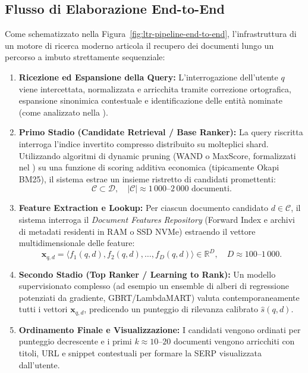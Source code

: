 \subsection{Flusso di Elaborazione End-to-End}
\label{subsec:flusso-elaborazione-end-to-end}
Come schematizzato nella Figura~\ref{fig:ltr-pipeline-end-to-end}, l'infrastruttura di un motore di ricerca moderno articola il recupero dei documenti lungo un percorso a imbuto strettamente sequenziale:
\begin{enumerate}
    \item \textbf{Ricezione ed Espansione della Query:} L'interrogazione dell'utente $q$ viene intercettata, normalizzata e arricchita tramite correzione ortografica, espansione sinonimica contestuale e identificazione delle entit\`a nominate (come analizzato nella ).
    \item \textbf{Primo Stadio (Candidate Retrieval / Base Ranker):} La query riscritta interroga l'indice invertito compresso distribuito su molteplici shard. Utilizzando algoritmi di dynamic pruning (WAND o MaxScore, formalizzati nel ) su una funzione di scoring additiva economica (tipicamente Okapi BM25), il sistema estrae un insieme ristretto di candidati promettenti:
    \begin{equation}
    \mathcal{C} \subset \mathcal{D}, \quad |\mathcal{C}| \approx 1\,000 \text{--} 2\,000 \text{ documenti}.
    \end{equation}
    \item \textbf{Feature Extraction e Lookup:} Per ciascun documento candidato $d \in \mathcal{C}$, il sistema interroga il \textit{Document Features Repository} (Forward Index e archivi di metadati residenti in RAM o SSD NVMe) estraendo il vettore multidimensionale delle feature:
    \begin{equation}
    \mathbf{x}_{q,d} = \langle f_1(q, d), f_2(q, d), \dots, f_D(q, d) \rangle \in \mathbb{R}^D, \quad D \approx 100 \text{--} 1\,000.
    \end{equation}
    \item \textbf{Secondo Stadio (Top Ranker / Learning to Rank):} Un modello supervisionato complesso (ad esempio un ensemble di alberi di regressione potenziati da gradiente, GBRT/LambdaMART) valuta contemporaneamente tutti i vettori $\mathbf{x}_{q,d}$, predicendo un punteggio di rilevanza calibrato $\hat{s}(q, d)$.
    \item \textbf{Ordinamento Finale e Visualizzazione:} I candidati vengono ordinati per punteggio decrescente e i primi $k \approx 10\text{--}20$ documenti vengono arricchiti con titoli, URL e snippet contestuali per formare la SERP visualizzata dall'utente.
\end{enumerate}

